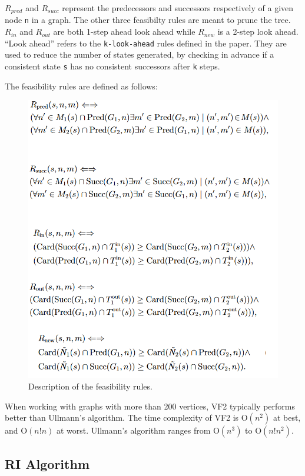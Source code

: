 \documentclass{article}
\begin{document}
  $R_{pred}$ and $R_{succ}$ represent the predecessors and successors respectively of a given node \texttt{n}  in a graph. The other three feasibilty rules are meant to prune the tree. $R_{in}$ and $R_{out}$ are both 1-step ahead look ahead while $R_{new}$ is a 2-step look ahead. ``Look ahead'' refers to the \texttt{k-look-ahead} rules defined in the paper. They are used to reduce the number of states generated, by checking in advance if a consistent state \texttt{s} has no consistent successors after \texttt{k} steps.

  The feasibility rules are defined as follows:

  \begin{figure}[H]
    \centering
    \includegraphics{images/vf2_algo.png}
    \caption{Description of the feasibility rules.}
    \label{fig:vf2feas}
  \end{figure}

  When working with graphs with more than 200 vertices, VF2 typically performs better than Ullmann's algorithm. The time complexity of VF2 is O$(n^2)$ at best, and O$(n!n)$ at worst. Ullmann's algorithm ranges from O$(n^3)$ to O$(n!n^2)$.\cite{cordella}

  \subsection{RI Algorithm}
\end{document}

